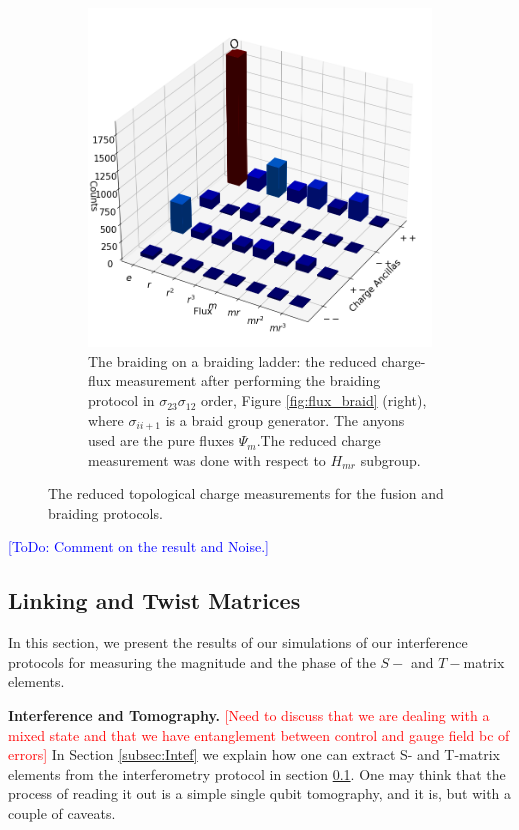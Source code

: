 \documentclass[two column]{article}
\newcommand{\caro}[1]{\textcolor{red}{[#1]}}
\newcommand{\jovan}[1]{\textcolor{blue}{[#1]}}
\begin{document}
\begin{figure}
\begin{subfigure}{0.47\textwidth}
    \includegraphics[width=\linewidth]{Figures/braid_link.png}
    \caption{The braiding on a braiding ladder: the reduced charge-flux measurement after performing the braiding protocol in $\sigma_{23}\sigma_{12}$ order, Figure \ref{fig:flux_braid} (right), where $\sigma_{ii+1}$ is a braid group generator. The anyons used are the pure fluxes $\Psi_m$.The reduced charge measurement was done with respect to $H_{mr}$ subgroup.}
    \label{fig:braid_link}
\end{subfigure}
\caption{The reduced topological charge measurements for the fusion and braiding protocols.}
\label{fig:red_charge_res}
\end{figure}
\jovan{ToDo: Comment on the result and Noise.}


\subsection{Linking and Twist Matrices}

In this section, we present the results of our simulations of our interference protocols for measuring the magnitude and the phase of the $S-$ and $T-$matrix elements. 

\textbf{Interference and Tomography.}
\caro{Need to discuss that we are dealing with a mixed state and that we have entanglement between control and gauge field bc of errors}
In Section \ref{subsec:Intef} we explain how one can extract  S- and T-matrix elements from the interferometry protocol in section \ref{}.
One may think that the process of reading it out is a simple single qubit tomography, and it is, but with a couple of caveats.
\end{document}
